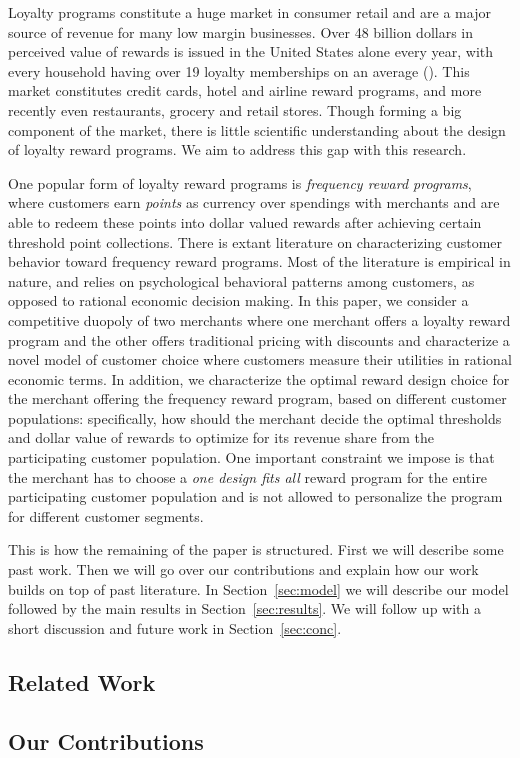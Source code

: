 Loyalty programs constitute a huge market in consumer retail and are a major source of revenue for many low margin businesses.
Over 48 billion dollars in perceived value of rewards is issued in the United States alone every year, with every household having over 19 loyalty memberships on an average (\cite{berry2013loyalty}).
This market constitutes credit cards, hotel and airline reward programs, and more recently even restaurants, grocery and retail stores.
Though forming a big component of the market, there is little scientific understanding about the design of loyalty reward programs. We aim to address this gap with this research.

One popular form of loyalty reward programs is \emph{frequency reward programs}, where customers earn \emph{points} as currency over spendings with merchants and are able to redeem these points into dollar valued rewards after achieving certain threshold point collections.
There is extant literature on characterizing customer behavior toward frequency reward programs.
Most of the literature is empirical in nature, and relies on psychological behavioral patterns among customers, as opposed to rational economic decision making.
In this paper, we consider a competitive duopoly of two merchants where one merchant offers a loyalty reward program and the other offers traditional pricing with discounts and characterize a novel model of customer choice where customers measure their utilities in rational economic terms.
In addition, we characterize the optimal reward design choice for the merchant offering the frequency reward program, based on different customer populations: specifically, how should the merchant decide the optimal thresholds and dollar value of rewards to optimize for its revenue share from the participating customer population.
One important constraint we impose is that the merchant has to choose a \emph{one design fits all} reward program for the entire participating customer population and is not allowed to personalize the program for different customer segments.

This is how the remaining of the paper is structured. First we will describe some past work. Then we will go over our contributions and explain how our work builds on top of past literature. In Section~\ref{sec:model} we will describe our model followed by the main results in Section~\ref{sec:results}. We will follow up with a short discussion and future work in Section~\ref{sec:conc}.

\subsection{Related Work}


\subsection{Our Contributions}


